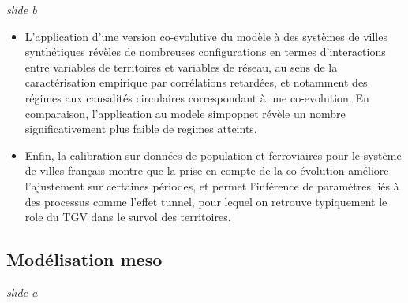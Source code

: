 \documentclass[11pt]{article}
\begin{document}
\textit{slide b}
	
\begin{itemize}
	\item L'application d'une version co-evolutive du modèle à des systèmes de villes synthétiques révèles de nombreuses configurations en termes d'interactions entre variables de territoires et variables de réseau, au sens de la caractérisation empirique par corrélations retardées, et notamment des régimes aux causalités circulaires correspondant à une co-evolution. En comparaison, l'application au modele simpopnet révèle un nombre significativement plus faible de regimes atteints.
	\item Enfin, la calibration sur données de population et ferroviaires pour le système de villes français montre que la prise en compte de la co-évolution améliore l'ajustement sur certaines périodes, et permet l'inférence de paramètres liés à des processus comme l'effet tunnel, pour lequel on retrouve typiquement le role du TGV dans le survol des territoires.
\end{itemize}





\subsection*{Modélisation meso}



\textit{slide a}
\end{document}
